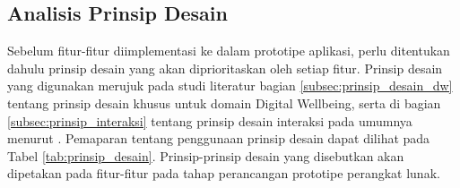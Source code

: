 \subsection{Analisis Prinsip Desain}
Sebelum fitur-fitur diimplementasi ke dalam prototipe aplikasi, perlu ditentukan dahulu prinsip desain yang akan diprioritaskan oleh setiap fitur. Prinsip desain yang digunakan merujuk pada studi literatur bagian \ref{subsec:prinsip_desain_dw} tentang prinsip desain khusus untuk domain Digital Wellbeing, serta di bagian \ref{subsec:prinsip_interaksi} tentang prinsip desain interaksi pada umumnya menurut \textcite{PreeceRogersSharp15}. Pemaparan tentang penggunaan prinsip desain dapat dilihat pada Tabel \ref{tab:prinsip_desain}. Prinsip-prinsip desain yang disebutkan akan dipetakan pada fitur-fitur pada tahap perancangan prototipe perangkat lunak.

